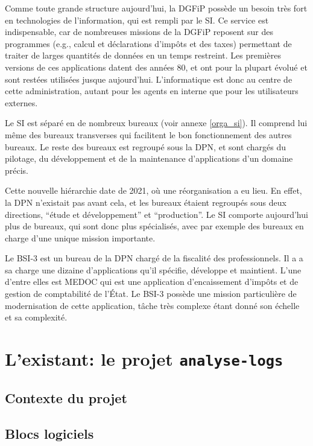 \documentclass[openany, 12pt]{memoir}
\begin{document}
\bigskip

Comme toute grande structure aujourd'hui, la \gls{DGFiP} possède un besoin très fort en technologies de l'information, qui est rempli par le \gls{SI}. Ce service est indispensable, car de nombreuses missions de la DGFiP reposent sur des programmes (e.g., calcul et déclarations d'impôts et des taxes) permettant de traiter de larges quantités de données en un temps restreint. Les premières versions de ces applications datent des années 80, et ont pour la plupart évolué et sont restées utilisées jusque aujourd'hui. L'informatique est donc au centre de cette administration, autant pour les agents en interne que pour les utilisateurs externes.

Le \gls{SI} est séparé en de nombreux bureaux (voir annexe \ref{orga_si}). Il comprend lui même des bureaux \glspl{transverse} qui facilitent le bon fonctionnement des autres bureaux. Le reste des bureaux est regroupé sous la \gls{DPN}, et sont chargés du pilotage, du développement et de la maintenance d'applications d'un domaine précis.

Cette nouvelle hiérarchie date de 2021, où une réorganisation a eu lieu. En effet, la \gls{DPN} n'existait pas avant cela, et les bureaux étaient regroupés sous deux directions, ``étude et développement'' et ``production''. Le \gls{SI} comporte aujourd'hui plus de bureaux, qui sont donc plus spécialisés, avec par exemple des bureaux en charge d'une unique mission importante.

\bigskip

Le \gls{BSI-3} est un bureau de la \gls{DPN} chargé de la fiscalité des professionnels. Il a a sa charge une dizaine d'applications qu'il spécifie, développe et maintient. L'une d'entre elles est \gls{MEDOC} qui est une application d'encaissement d'impôts et de gestion de comptabilité de l'État. Le \gls{BSI-3} possède une mission particulière de modernisation de cette application, tâche très complexe étant donné son échelle et sa complexité.

\newpage
\chapter{L'existant: le projet \texttt{analyse-logs}}

\section{Contexte du projet}

\section{Blocs logiciels}
\end{document}
